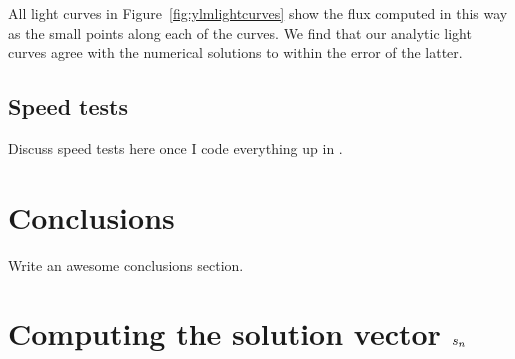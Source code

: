 \documentclass[modern]{aastex61}
\begin{document}
All light curves in Figure~\ref{fig:ylmlightcurves} show the flux computed
in this way as the small points along each of the curves. We find that our
analytic light curves agree with the numerical solutions to within the error
of the latter.

\subsection{Speed tests}
\label{sec:starryspeed}

Discuss speed tests here once I code everything up in \C.

\section{Conclusions}
\label{sec:conclusions}

Write an awesome conclusions section.

%


\appendix
\section{Computing the solution vector $\MakeLowercase{s_n}$}
\label{sec:solutionvector}
\end{document}
